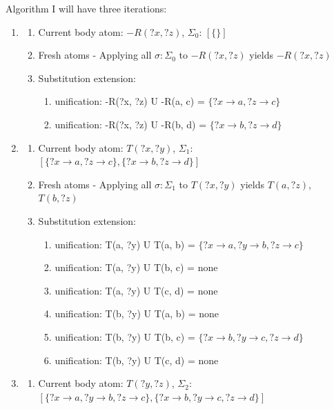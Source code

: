 \documentclass[sigconf,screen,review,natbib]{acmart}
\theoremstyle{definition}
\begin{document}
Algorithm I will have three iterations:
\begin{enumerate}
	\item \begin{enumerate}
		      \item Current body atom: $-R(?x, ?z)$, $\Sigma_0$: $[\{\}]$
		      \item Fresh atoms - Applying all $\sigma : \Sigma_0$ to $-R(?x, ?z)$ yields $-R(?x, ?z)$
		      \item Substitution extension: \begin{enumerate}
			            \item unification: -R(?x, ?z) U -R(a, c) = $\{?x \rightarrow a, ?z \rightarrow c\}$
			            \item unification: -R(?x, ?z) U -R(b, d) = $\{?x \rightarrow b, ?z \rightarrow d\}$
		            \end{enumerate}
	      \end{enumerate}
	\item \begin{enumerate}
		      \item Current body atom: $T(?x, ?y)$, $\Sigma_1$: $[\{?x \rightarrow a, ?z \rightarrow c\}, \{?x \rightarrow b, ?z \rightarrow d\}]$
		      \item Fresh atoms - Applying all $\sigma : \Sigma_1$ to $T(?x, ?y)$ yields $T(a, ?z)$, $T(b, ?z)$
		      \item Substitution extension: \begin{enumerate}
			            \item unification: T(a, ?y) U T(a, b) = $\{?x \rightarrow a, ?y \rightarrow b, ?z \rightarrow c\}$
			            \item unification: T(a, ?y) U T(b, c) = none
			            \item unification: T(a, ?y) U T(c, d) = none
			            \item unification: T(b, ?y) U T(a, b) = none
			            \item unification: T(b, ?y) U T(b, c) = $\{?x \rightarrow b, ?y \rightarrow c, ?z \rightarrow d\}$
			            \item unification: T(b, ?y) U T(c, d) = none
		            \end{enumerate}
	      \end{enumerate}
	\item \begin{enumerate}
		      \item Current body atom: $T(?y, ?z)$, $\Sigma_2$: $[\{?x \rightarrow a, ?y \rightarrow b, ?z \rightarrow c\}, \{?x \rightarrow b, ?y \rightarrow c, ?z \rightarrow d\}]$

\end{enumerate}
\end{enumerate}
\end{document}
